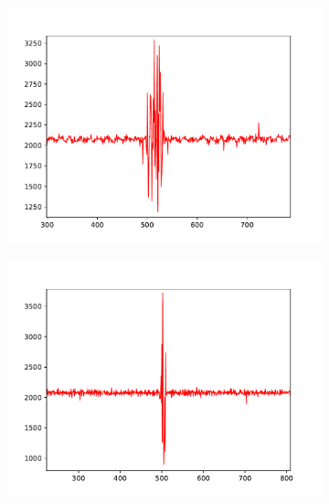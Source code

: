 \begin{figure}[h]
	\centering
	\begin{subfigure}{.5\textwidth}
		\includegraphics[width=\textwidth]{img/strike1}
	\end{subfigure}%
	\begin{subfigure}{.5\textwidth}
		\includegraphics[width=\textwidth]{img/strike2}
	\end{subfigure}\\
	\begin{subfigure}{.5\textwidth}

\end{subfigure}
\end{figure}
